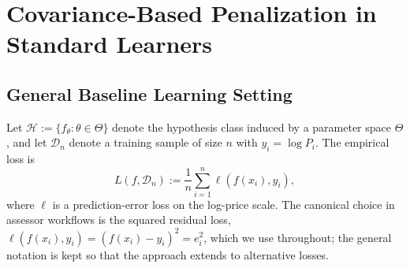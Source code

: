 \documentclass{article}
\theoremstyle{plain}
\theoremstyle{definition}
\newcommand{\1}{\mathbf{1}}
\newcommand{\D}{\mathcal{D}}
\renewcommand{\H}{\mathcal{H}}
\begin{document}



\section{Covariance-Based Penalization in Standard Learners}
\label{sec:covariance_penalty_learning_in_learners}








\subsection{General Baseline Learning Setting}

Let
$
\H := \{f_\theta : \theta \in \Theta\}
$
denote the hypothesis class induced by a parameter space $\Theta$, and let $\D_n$ denote a training sample of size $n$ with $y_i=\log P_i$. The empirical loss is
\[
L(f, \D_n)
:=
\frac{1}{n}\sum_{i=1}^n \ell(f(x_i),y_i),
\]
where $\ell$ is a prediction-error loss on the log-price scale. The canonical choice in assessor workflows is the squared residual loss, $\ell(f(x_i),y_i)=(f(x_i)-y_i)^2=e_i^2$, which we use throughout; the general notation is kept so that the approach extends to alternative losses.
\end{document}
